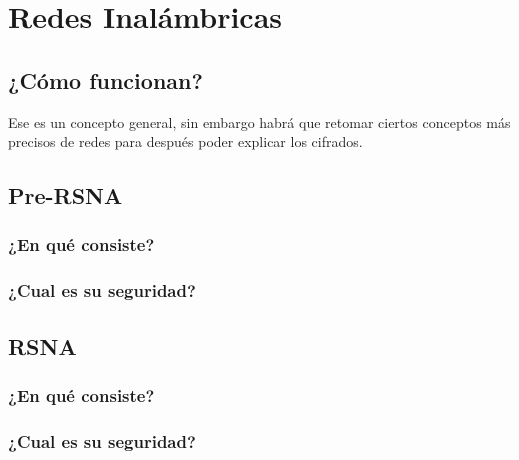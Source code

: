 \chapter{Redes Inalámbricas}
\section{¿Cómo funcionan?}
Ese es un concepto general, sin embargo habrá que retomar ciertos conceptos más precisos de redes para después poder explicar los cifrados.
\section{Pre-RSNA}
\subsection{¿En qué consiste?}
\subsection{¿Cual es su seguridad?}
\section{RSNA}
\subsection{¿En qué consiste?}

\subsection{¿Cual es su seguridad?}


